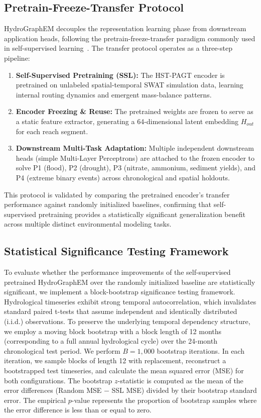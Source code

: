 \documentclass[preprint,12pt]{elsarticle}
\begin{document}
\subsection{Pretrain-Freeze-Transfer Protocol}
HydroGraphEM decouples the representation learning phase from downstream application heads, following the pretrain-freeze-transfer paradigm commonly used in self-supervised learning~\citep{bommasani2021opportunities}. The transfer protocol operates as a three-step pipeline:
\begin{enumerate}
    \item \textbf{Self-Supervised Pretraining (SSL):} The HST-PAGT encoder is pretrained on unlabeled spatial-temporal SWAT simulation data, learning internal routing dynamics and emergent mass-balance patterns.
    \item \textbf{Encoder Freezing \& Reuse:} The pretrained weights are frozen to serve as a static feature extractor, generating a 64-dimensional latent embedding $H_{out}$ for each reach segment.
    \item \textbf{Downstream Multi-Task Adaptation:} Multiple independent downstream heads (simple Multi-Layer Perceptrons) are attached to the frozen encoder to solve P1 (flood), P2 (drought), P3 (nitrate, ammonium, sediment yields), and P4 (extreme binary events) across chronological and spatial holdouts.
\end{enumerate}
This protocol is validated by comparing the pretrained encoder's transfer performance against randomly initialized baselines, confirming that self-supervised pretraining provides a statistically significant generalization benefit across multiple distinct environmental modeling tasks.

\subsection{Statistical Significance Testing Framework}
To evaluate whether the performance improvements of the self-supervised pretrained HydroGraphEM over the randomly initialized baseline are statistically significant, we implement a block-bootstrap significance testing framework. Hydrological timeseries exhibit strong temporal autocorrelation, which invalidates standard paired t-tests that assume independent and identically distributed (i.i.d.) observations. To preserve the underlying temporal dependency structure, we employ a moving block bootstrap with a block length of 12 months (corresponding to a full annual hydrological cycle) over the 24-month chronological test period. We perform $B = 1{,}000$ bootstrap iterations. In each iteration, we sample blocks of length 12 with replacement, reconstruct a bootstrapped test timeseries, and calculate the mean squared error (MSE) for both configurations. The bootstrap $z$-statistic is computed as the mean of the error differences (Random MSE $-$ SSL MSE) divided by their bootstrap standard error. The empirical $p$-value represents the proportion of bootstrap samples where the error difference is less than or equal to zero.
\end{document}
